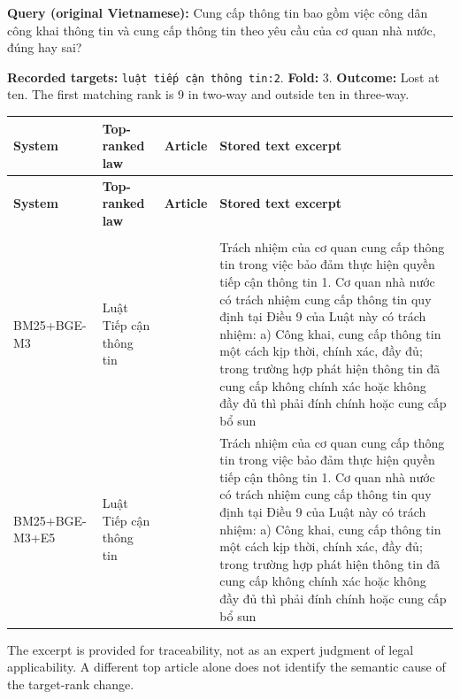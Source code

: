 \textbf{Query (original Vietnamese):} Cung cấp thông tin bao gồm việc công dân công khai thông tin và cung cấp thông tin theo yêu cầu của cơ quan nhà nước, đúng hay sai?

\textbf{Recorded targets:} \texttt{luật tiế\allowbreak{}p cận th\allowbreak{}ông tin:\allowbreak{}2}. \textbf{Fold:} 3. \textbf{Outcome:} Lost at ten. The first matching rank is 9 in two-way and outside ten in three-way.

\begingroup
\scriptsize
\setlength{\tabcolsep}{2pt}
\renewcommand{\arraystretch}{1.0}
\begin{longtable}{>{\raggedright\arraybackslash}p{1.948cm}>{\raggedright\arraybackslash}p{2.497cm}>{\raggedright\arraybackslash}p{1.822cm}>{\raggedright\arraybackslash}p{8.852cm}}
\toprule
\textbf{System} & \textbf{Top-ranked law} & \textbf{Article} & \textbf{Stored text excerpt} \\
\midrule
\endfirsthead
\toprule
\textbf{System} & \textbf{Top-ranked law} & \textbf{Article} & \textbf{Stored text excerpt} \\
\midrule
\endhead
\midrule
\multicolumn{4}{r}{\footnotesize Continued on next page}\\
\endfoot
\bottomrule
\endlastfoot
BM25+\allowbreak{}BGE-M3 & Luật Tiếp cận thông tin & 34 & Trách nhiệm của cơ quan cung cấp thông tin trong việc bảo đảm thực hiện quyền tiếp cận thông tin    1. Cơ quan nhà nước có trách nhiệm cung cấp thông tin quy định tại Điều 9 của Luật này có trách nhiệm:    a) Công khai, cung cấp thông tin một cách kịp thời, chính xác, đầy đủ; trong trường hợp phát hiện thông tin đã cung cấp không chính xác hoặc không đầy đủ thì phải đính chính hoặc cung cấp bổ sun \\
BM25+\allowbreak{}BGE-M3+\allowbreak{}E5 & Luật Tiếp cận thông tin & 34 & Trách nhiệm của cơ quan cung cấp thông tin trong việc bảo đảm thực hiện quyền tiếp cận thông tin    1. Cơ quan nhà nước có trách nhiệm cung cấp thông tin quy định tại Điều 9 của Luật này có trách nhiệm:    a) Công khai, cung cấp thông tin một cách kịp thời, chính xác, đầy đủ; trong trường hợp phát hiện thông tin đã cung cấp không chính xác hoặc không đầy đủ thì phải đính chính hoặc cung cấp bổ sun \\
\end{longtable}
\endgroup

The excerpt is provided for traceability, not as an expert judgment of legal applicability. A different top article alone does not identify the semantic cause of the target-rank change.

